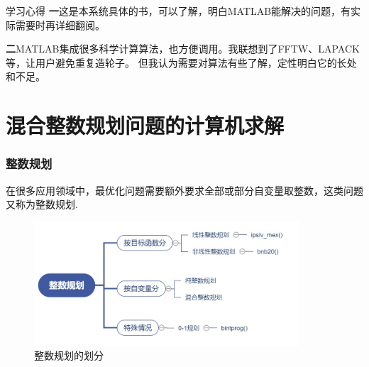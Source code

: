 \documentclass[10pt]{beamer}
\begin{document}
%		
		\begin{frame}[allowframebreaks]{学习心得}
	\textbf{一}\quad 这是本系统具体的书，可以了解，明白MATLAB能解决的问题，有实际需要时再详细翻阅。
	
	\textbf{二}\quad MATLAB集成很多科学计算算法，也方便调用。我联想到了FFTW、LAPACK等，让用户避免重复造轮子。
	但我认为需要对算法有些了解，定性明白它的长处和不足。
		\end{frame}


\section{混合整数规划问题的计算机求解}
\begin{frame}[allowframebreaks]
  \frametitle{整数规划}
  
  在很多应用领域中，最优化问题需要额外要求全部或部分自变量取整数，这类问题又称为整数规划.
  \begin{figure}
  \centering
  \includegraphics[width=0.88\textwidth]{zsgh.jpg}
  \caption{整数规划的划分}
  \end{figure}
  \end{frame}
  
\end{document}
